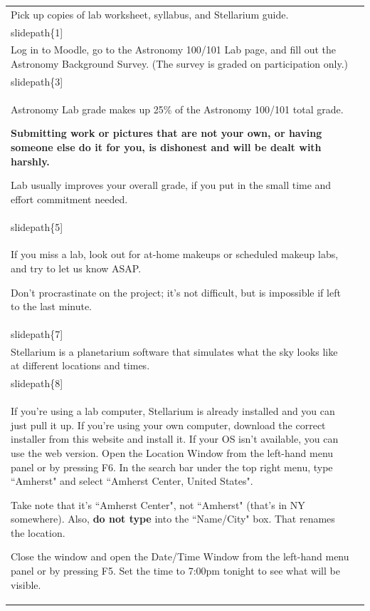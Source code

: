 \documentclass[12pt]{article}
\begin{document}
\begin{longtable}{|m{}|m{}|}\hline
Pick up copies of lab worksheet, syllabus, and Stellarium guide. & \texttt{[image: \\slidepath\{1]}}\\\hline
Log in to Moodle, go to the Astronomy 100/101 Lab page, and fill out the Astronomy Background Survey. (The survey is graded on participation only.) & \texttt{[image: \\slidepath\{3]}}\\\hline
Astronomy Lab grade makes up 25\% of the Astronomy 100/101 total grade.

\textbf{Submitting work or pictures that are not your own, or having someone else do it for you, is dishonest and will be dealt with harshly.}

Lab usually improves your overall grade, if you put in the small time and effort commitment needed. & \texttt{[image: \\slidepath\{5]}}\\\hline
If you miss a lab, look out for at-home makeups or scheduled makeup labs, and try to let us know ASAP.

Don't procrastinate on the project; it's not difficult, but is impossible if left to the last minute. & \texttt{[image: \\slidepath\{7]}}\\\hline
Stellarium is a planetarium software that simulates what the sky looks like at different locations and times. & \texttt{[image: \\slidepath\{8]}}\\\hline
If you're using a lab computer, Stellarium is already installed and you can just pull it up. If you're using your own computer, download the correct installer from this website and install it. If your OS isn't available, you can use the web version. Open the Location Window from the left-hand menu panel or by pressing F6. In the search bar under the top right menu, type ``Amherst" and select ``Amherst Center, United States".

Take note that it's ``Amherst Center", not ``Amherst" (that's in NY somewhere). Also, \textbf{do not type} into the ``Name/City" box. That renames the location.

Close the window and open the Date/Time Window from the left-hand menu panel or by pressing F5. Set the time to 7:00pm tonight to see what will be visible.


\end{longtable}
\end{document}
